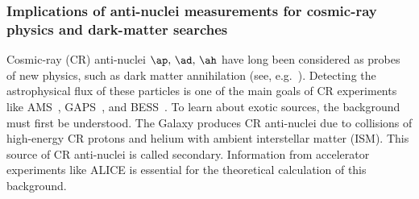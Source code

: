 \subsubsection{Implications of anti-nuclei measurements for cosmic-ray physics and dark-matter searches}

Cosmic-ray (CR) anti-nuclei $\ap,\,\ad,\,\ah$ have long been considered as probes of new physics, such as dark matter annihilation (see, e.g.~\cite{Donato:1999gy, Baer:2005tw, Donato:2008yx, Brauninger:2009pe, Kadastik:2009ts, Cui:2010ud, Dal:2012my, Ibarra:2012cc, Fornengo:2013osa, Carlson:2014ssa, Aramaki:2015pii,Korsmeier:2017xzj}). Detecting the astrophysical flux of these particles is one of the main goals of CR experiments like AMS~\cite{Giovacchini:2007dwa,kounineHebar}, GAPS~\cite{vonDoetinchem:2015zva,Aramaki:2015laa}, and BESS~\cite{Abe:2011nx,2012PhRvL.108m1301A}. To learn about exotic sources, the background must first be understood. The Galaxy produces CR anti-nuclei due to collisions of high-energy CR protons and helium with ambient interstellar matter (ISM). This source of CR anti-nuclei is called secondary. Information from accelerator experiments like ALICE is essential for the theoretical calculation of this background.

